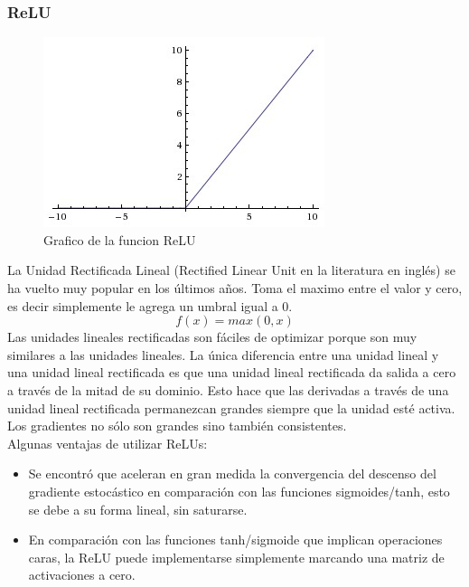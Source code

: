 \documentclass[a4paper,11pt,spanish]{book}
\begin{document}
	  \subsubsection {ReLU}
	    \begin{figure}[H]
	      \begin{center}
	       \includegraphics[width=0.4\linewidth]{./img/relu.jpeg}
	      \end{center}
	      \caption{Grafico de la funcion ReLU}
	      \label{fig:relu}
	    \end{figure}
	    La Unidad Rectificada Lineal (Rectified Linear Unit en la literatura en inglés) se ha vuelto muy popular en los últimos años. Toma el maximo entre el valor y cero, es decir
	    simplemente le agrega un umbral igual a 0.
	    \begin{equation}
	     f(x) = max(0,x)
	    \end{equation}
	    Las unidades lineales rectificadas son fáciles de optimizar porque son muy similares a las unidades lineales.
	    La única diferencia entre una unidad lineal y una unidad lineal rectificada es que una unidad lineal rectificada da salida a cero a través de la mitad de su dominio.
	    Esto hace que las derivadas a través de una unidad lineal rectificada permanezcan grandes siempre que la unidad esté activa.
	    Los gradientes no sólo son grandes sino también consistentes.\\
	    Algunas ventajas de utilizar ReLUs:
	    \begin{itemize}
	      \item Se encontró que aceleran en gran medida la convergencia del descenso del gradiente estocástico en comparación con las funciones sigmoides/tanh, esto se debe a su forma lineal, sin saturarse.
	      \item En comparación con las funciones tanh/sigmoide que implican operaciones caras, la ReLU puede implementarse simplemente marcando una matriz de activaciones a cero.
	    \end{itemize}
\end{document}
